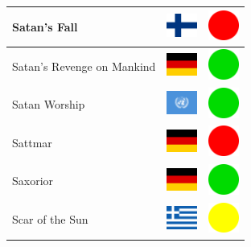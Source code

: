 \documentclass[12pt, a4paper, twoside]{report}
\begin{document}
\begin{center}
\begin{longtable}{|p{5cm}|p{2cm}|p{2cm}|}
 Satan's Fall                                               & \includegraphics[width=1cm]{../4x3/fi} &   \includegraphics[width=1cm]{../likes/n} \\ \hline
 Satan's Revenge on Mankind                                 & \includegraphics[width=1cm]{../4x3/de} &   \includegraphics[width=1cm]{../likes/y} \\ \hline
 Satan Worship                                              & \includegraphics[width=1cm]{../4x3/un} &   \includegraphics[width=1cm]{../likes/y} \\ \hline
 Sattmar                                                    & \includegraphics[width=1cm]{../4x3/de} &   \includegraphics[width=1cm]{../likes/n} \\ \hline
 Saxorior                                                   & \includegraphics[width=1cm]{../4x3/de} &   \includegraphics[width=1cm]{../likes/y} \\ \hline
 Scar of the Sun                                            & \includegraphics[width=1cm]{../4x3/gr} &   \includegraphics[width=1cm]{../likes/m} \\ \hline

\end{longtable}
\end{center}
\end{document}
